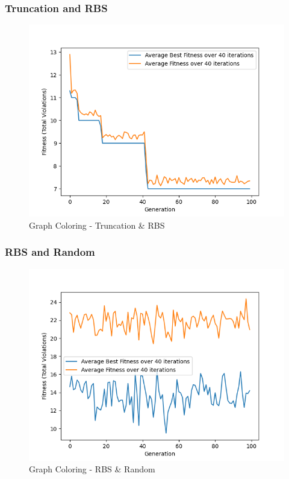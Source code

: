 \documentclass[11pt, letterpaper]{article}
\begin{document}
\subsubsection {Truncation and RBS}
\begin{figure}[H]
    \centering
    \includegraphics[scale = 0.6]{images/graphcoloring_tr_rb.png}
    \caption {Graph Coloring - Truncation \& RBS}
    \label {fig:gcTR}
\end{figure}

\subsubsection {RBS and Random}
\begin{figure}[H]
    \centering
    \includegraphics[scale = 0.6]{images/graphcoloring_rb_rd.png}
    \caption {Graph Coloring - RBS \& Random}
    \label {fig:gcRbR}
\end{figure}
\end{document}

